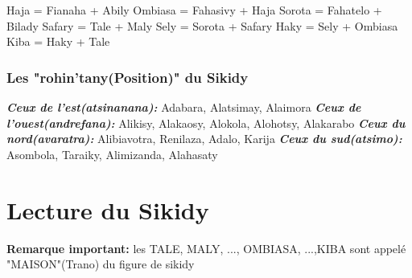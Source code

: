 \documentclass[12pt]{report}
\begin{document}
Haja = Fianaha + Abily\newline
Ombiasa = Fahasivy + Haja\newline 
Sorota = Fahatelo + Bilady \newline
Safary = Tale + Maly \newline
Sely = Sorota + Safary \newline
Haky = Sely + Ombiasa \newline
Kiba = Haky + Tale \newline

\subsubsection{Les "rohin'tany(Position)" du Sikidy}

\textbf{\textit{Ceux de l'est(atsinanana):}} \newline
Adabara, Alatsimay, Alaimora \newline \newline
\textbf{\textit{Ceux de l'ouest(andrefana):}} \newline 
Alikisy, Alakaosy, Alokola, Alohotsy, Alakarabo \newline \newline
\textbf{\textit{Ceux du nord(avaratra):}} \newline 
Alibiavotra, Renilaza, Adalo, Karija \newline \newline
\textbf{\textit{Ceux du sud(atsimo):}} \newline 
Asombola, Taraiky, Alimizanda, Alahasaty 

\section{Lecture du Sikidy}
\textbf{Remarque important:} les TALE, MALY, ..., OMBIASA, ...,KIBA sont appelé "MAISON"(Trano) du figure de sikidy
\end{document}
